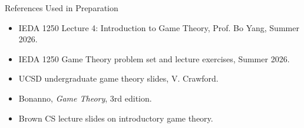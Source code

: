 \documentclass[10pt,aspectratio=169]{beamer}
\begin{document}
\begin{frame}{References Used in Preparation}
\small
\begin{itemize}
  \item IEDA 1250 Lecture 4: Introduction to Game Theory, Prof. Bo Yang, Summer 2026.
  \item IEDA 1250 Game Theory problem set and lecture exercises, Summer 2026.
  \item UCSD undergraduate game theory slides, V. Crawford.
  \item Bonanno, \emph{Game Theory}, 3rd edition.
  \item Brown CS lecture slides on introductory game theory.
\end{itemize}
\end{frame}
\end{document}
